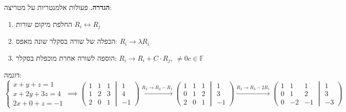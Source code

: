 \documentclass[]{article}
\newcommand\siff  {\longleftrightarrow}
\newcommand\F     {\mathbb{F}}
\newcommand\cl [1]    {\left ( #1 \right )}
\begin{document}
	\textbf{הגדרה. }פעולות אלמנטריות על מטריצה: 
	\begin{enumerate}
		\item החלפת מיקום שורות $R_i \siff R_j$\\
		\item הכפלה של שורה בסקלר שונה מאפס: $R_i \to \lambda R_i$
		\item הוספה לשורה אחרת מוכפלת בסקלר: $R_i \to R_i + C \cdot R_j, \ \neq 0 c \in \F$
	\end{enumerate}
	
	דוגמה: 
	\[ \begin{cases}
		x + y + z = 1 \\
		x + 2y + 3z = 4\\
		2x + 0 + z = -1
	\end{cases} \implies \left( 
	\begin{matrix}
		1  & 1 & 1\\
		1 & 2 & 3 \\
		2 & 0 & 1
	\end{matrix}
	\middle\vert
	\begin{matrix}
		1 \\
		4 \\
		-1
	\end{matrix}
	\right) \overset{R_2 \to R_2 - R_1}{\to} \cl{\begin{matrix}
			1 & 1 &1 \\
			0 & 1 & 2 \\
			2 & 0 & 1
	\end{matrix} \middle\vert \begin{matrix}
	1 \\ 3 \\ -1
	\end{matrix}} \overset{R_3 \to R_3 - 2R_1}{\to} \cl{\begin{matrix}
				1 &1 & 1 \\
				0 & 1 & 2\\
				0 & -2 & -1
	\end{matrix}\middle\vert\begin{matrix}
	1 \\ 3 \\ -3
	\end{matrix}} \]
	
\end{document}
